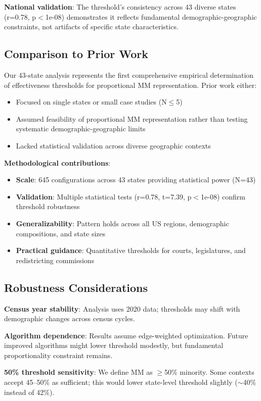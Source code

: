 \textbf{National validation}: The threshold's consistency across 43 diverse states (r=0.78, p$<$1e-08) demonstrates it reflects fundamental demographic-geographic constraints, not artifacts of specific state characteristics.

\subsection{Comparison to Prior Work}

Our 43-state analysis represents the first comprehensive empirical determination of effectiveness thresholds for proportional MM representation. Prior work either:
\begin{itemize}
    \item Focused on single states or small case studies (N$\leq$5)
    \item Assumed feasibility of proportional MM representation rather than testing systematic demographic-geographic limits
    \item Lacked statistical validation across diverse geographic contexts
\end{itemize}

\textbf{Methodological contributions}:
\begin{itemize}
    \item \textbf{Scale}: 645 configurations across 43 states providing statistical power (N=43)
    \item \textbf{Validation}: Multiple statistical tests (r=0.78, t=7.39, p$<$1e-08) confirm threshold robustness
    \item \textbf{Generalizability}: Pattern holds across all US regions, demographic compositions, and state sizes
    \item \textbf{Practical guidance}: Quantitative thresholds for courts, legislatures, and redistricting commissions
\end{itemize}

\subsection{Robustness Considerations}

\textbf{Census year stability}: Analysis uses 2020 data; thresholds may shift with demographic changes across census cycles.

\textbf{Algorithm dependence}: Results assume edge-weighted optimization. Future improved algorithms might lower threshold modestly, but fundamental proportionality constraint remains.

\textbf{50\% threshold sensitivity}: We define MM as $\geq$50\% minority. Some contexts accept 45--50\% as sufficient; this would lower state-level threshold slightly ($\sim$40\% instead of 42\%).
